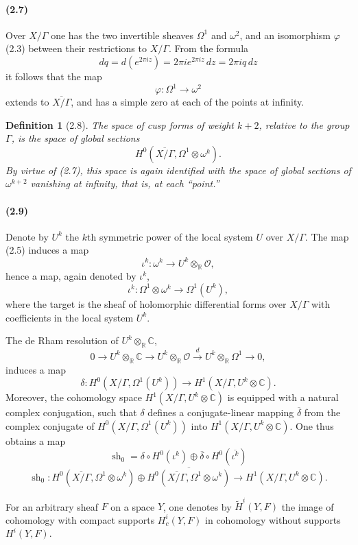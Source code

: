 \documentclass[10pt]{article}
\newcommand{\C}{\mathbb C}
\newcommand{\R}{\mathbb R}
\newcommand{\cO}{\mathcal O}
\newcommand{\sh}{\operatorname{sh}}
\newtheorem*{definition}{Definition}
\begin{document}
\paragraph{(2.7)}
Over $X/\Gamma$ one has the two invertible sheaves $\Omega^1$ and $\omega^2$, and
an isomorphism $\varphi$ (2.3) between their restrictions to $X/\Gamma$. From the formula
\[
dq=d(e^{2\pi iz})=2\pi i e^{2\pi iz}\,dz=2\pi iq\,dz
\]
it follows that the map
\[
\varphi:\Omega^1\to \omega^2
\]
extends to $\overline{X/\Gamma}$, and has a simple zero at each of the points at infinity.

\begin{definition}[2.8]
The space of cusp forms of weight $k+2$, relative to the group $\Gamma$, is the space of
global sections
\[
H^0(\overline{X/\Gamma},\Omega^1\otimes\omega^k).
\]
By virtue of (2.7), this space is again identified with the space of global sections of
$\omega^{k+2}$ vanishing at infinity, that is, at each ``point.''
\end{definition}

\paragraph{(2.9)}
Denote by $U^k$ the $k$th symmetric power of the local system $U$ over $X/\Gamma$.
The map (2.5) induces a map
\[
\iota^k:\omega^k\to U^k\otimes_\R\cO,
\]
hence a map, again denoted by $\iota^k$,
\[
\iota^k:\Omega^1\otimes\omega^k\to \Omega^1(U^k),
\]
where the target is the sheaf of holomorphic differential forms over $X/\Gamma$ with
coefficients in the local system $U^k$.

The de Rham resolution of $U^k\otimes_\R\C$,
\[
0\to U^k\otimes_\R\C\to U^k\otimes_\R\cO
\xrightarrow{d}U^k\otimes_\R\Omega^1\to 0,
\]
induces a map
\[
\delta:H^0(X/\Gamma,\Omega^1(U^k))\to H^1(X/\Gamma,U^k\otimes\C).
\]
Moreover, the cohomology space $H^1(X/\Gamma,U^k\otimes\C)$ is equipped with a
natural complex conjugation, such that $\delta$ defines a conjugate-linear mapping
$\overline{\delta}$ from the complex conjugate of $H^0(X/\Gamma,\Omega^1(U^k))$ into
$H^1(X/\Gamma,U^k\otimes\C)$. One thus obtains a map
\[
\sh_0=\delta\circ H^0(\iota^k)\oplus
\overline{\delta}\circ H^0(\overline{\iota^k})
\]
\[
\sh_0:
H^0(\overline{X/\Gamma},\Omega^1\otimes\omega^k)
\oplus
\overline{H^0(\overline{X/\Gamma},\Omega^1\otimes\omega^k)}
\longrightarrow
H^1(X/\Gamma,U^k\otimes\C).
\]

For an arbitrary sheaf $F$ on a space $Y$, one denotes by
$\widetilde H^i(Y,F)$ the image of cohomology with compact supports
$H^i_c(Y,F)$ in cohomology without supports $H^i(Y,F)$.
\end{document}
